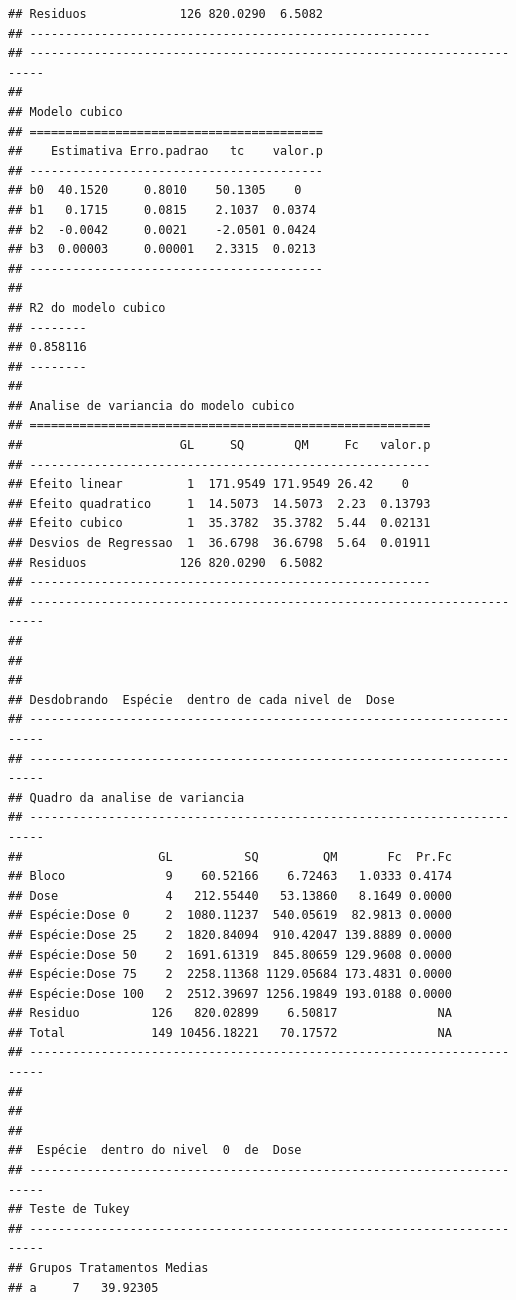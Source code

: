 \documentclass[
]{article}
\begin{document}
\begin{verbatim}
## Residuos             126 820.0290  6.5082               
## --------------------------------------------------------
## ------------------------------------------------------------------------
## 
## Modelo cubico
## =========================================
##    Estimativa Erro.padrao   tc    valor.p
## -----------------------------------------
## b0  40.1520     0.8010    50.1305    0   
## b1   0.1715     0.0815    2.1037  0.0374 
## b2  -0.0042     0.0021    -2.0501 0.0424 
## b3  0.00003     0.00001   2.3315  0.0213 
## -----------------------------------------
## 
## R2 do modelo cubico
## --------
## 0.858116
## --------
## 
## Analise de variancia do modelo cubico
## ========================================================
##                      GL     SQ       QM     Fc   valor.p
## --------------------------------------------------------
## Efeito linear         1  171.9549 171.9549 26.42    0   
## Efeito quadratico     1  14.5073  14.5073  2.23  0.13793
## Efeito cubico         1  35.3782  35.3782  5.44  0.02131
## Desvios de Regressao  1  36.6798  36.6798  5.64  0.01911
## Residuos             126 820.0290  6.5082               
## --------------------------------------------------------
## ------------------------------------------------------------------------
## 
## 
## 
## Desdobrando  Espécie  dentro de cada nivel de  Dose 
## ------------------------------------------------------------------------
## ------------------------------------------------------------------------
## Quadro da analise de variancia
## ------------------------------------------------------------------------
##                   GL          SQ         QM       Fc  Pr.Fc
## Bloco              9    60.52166    6.72463   1.0333 0.4174
## Dose               4   212.55440   53.13860   8.1649 0.0000
## Espécie:Dose 0     2  1080.11237  540.05619  82.9813 0.0000
## Espécie:Dose 25    2  1820.84094  910.42047 139.8889 0.0000
## Espécie:Dose 50    2  1691.61319  845.80659 129.9608 0.0000
## Espécie:Dose 75    2  2258.11368 1129.05684 173.4831 0.0000
## Espécie:Dose 100   2  2512.39697 1256.19849 193.0188 0.0000
## Residuo          126   820.02899    6.50817              NA
## Total            149 10456.18221   70.17572              NA
## ------------------------------------------------------------------------
## 
## 
## 
##  Espécie  dentro do nivel  0  de  Dose 
## ------------------------------------------------------------------------
## Teste de Tukey
## ------------------------------------------------------------------------
## Grupos Tratamentos Medias
## a     7   39.92305 

\end{verbatim}
\end{document}
